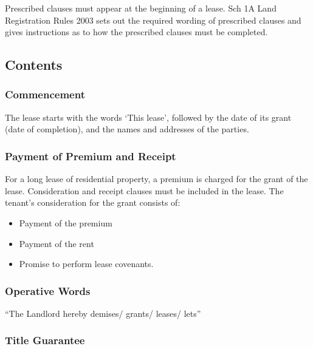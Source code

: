 \documentclass[
]{article}
\providecommand{\tightlist}{%
  \setlength{\itemsep}{0pt}\setlength{\parskip}{0pt}}
\begin{document}
Prescribed clauses must appear at the beginning of a lease. Sch 1A Land
Registration Rules 2003 sets out the required wording of prescribed
clauses and gives instructions as to how the prescribed clauses must be
completed.

\hypertarget{contents}{%
\subsection{Contents}\label{contents}}

\hypertarget{commencement}{%
\subsubsection{Commencement}\label{commencement}}

The lease starts with the words `This lease', followed by the date of
its grant (date of completion), and the names and addresses of the
parties.

\hypertarget{payment-of-premium-and-receipt}{%
\subsubsection{Payment of Premium and
Receipt}\label{payment-of-premium-and-receipt}}

For a long lease of residential property, a premium is charged for the
grant of the lease. Consideration and receipt clauses must be included
in the lease. The tenant's consideration for the grant consists of:

\begin{itemize}
\tightlist
\item
  Payment of the premium
\item
  Payment of the rent
\item
  Promise to perform lease covenants.
\end{itemize}

\hypertarget{operative-words}{%
\subsubsection{Operative Words}\label{operative-words}}

``The Landlord hereby demises/ grants/ leases/ lets''

\hypertarget{title-guarantee}{%
\subsubsection{Title Guarantee}\label{title-guarantee}}
\end{document}
